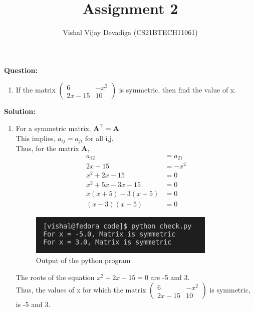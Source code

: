 \documentclass[journal,12pt,twocolumn]{IEEEtran}
\title{Assignment 2}
\author{Vishal Vijay Devadiga (CS21BTECH11061)}
\date{}
\let\vec\mathbf
\newcommand{\myvec}[1]{\ensuremath{\begin{pmatrix}#1\end{pmatrix}}}
\newcommand{\question}{\noindent \textbf{Question: }}
\newcommand{\solution}{\noindent \textbf{Solution: }}
\begin{document}
\maketitle
\question
\begin{enumerate}[label=]
	\item If the matrix $\myvec{6 & -x^2 \\ 2x - 15 & 10}$ is symmetric, then find the value of x.
\end{enumerate}
\solution
\begin{enumerate}[label=]
	\item For a symmetric matrix, $\vec{A}^{\top} = \vec{A}$. \\
	This implies, $a_{ij} = a_{ji}$ for all i,j. \\
	Thus, for the matrix $\vec{A}$,
	\begin{align}
		a_{12} &= a_{21}
		\\
		2x - 15 &= -x^2
		\\
		x^2 + 2x - 15 &= 0
		\\
		x^2 + 5x - 3x -15 &= 0
		\\
		x(x+5) - 3(x+5) &=0
		\\
		(x-3)(x+5) &= 0
	\end{align}
	\begin{figure}[h]
	\includegraphics[width=\columnwidth]{./figs/Output.png}
	\caption{Output of the python program}
	\end{figure}
	The roots of the equation $x^2 + 2x -15 = 0$ are -5 and 3. \\
	Thus, the values of x for which the matrix $\myvec{6 & -x^2 \\ 2x - 15 & 10}$ is symmetric, is -5 and 3.
	
\end{enumerate}
\end{document}
